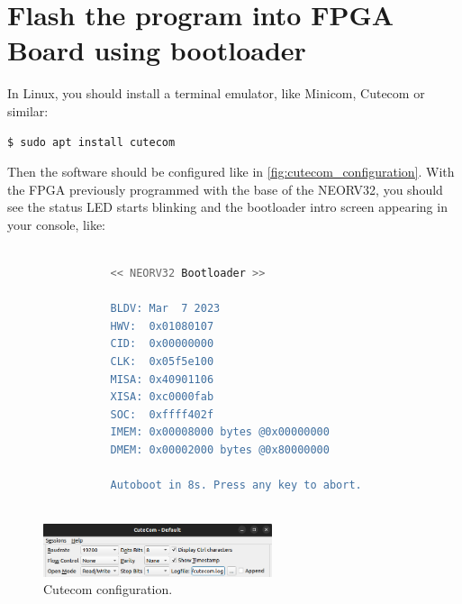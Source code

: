     \section{Flash the program into FPGA Board using bootloader}
    
        In Linux, you should install a terminal emulator, like Minicom, Cutecom or similar:
        
            \begin{lstlisting}[backgroundcolor = \color{lightgray}, language=bash]
                $ sudo apt install cutecom
            \end{lstlisting}
        
        Then the software should be configured like in \autoref{fig:cutecom_configuration}.  With the FPGA previously programmed with the base of the NEORV32, you should see the status LED starts blinking and the bootloader intro screen appearing in your console, like:
        
            \begin{lstlisting}[backgroundcolor = \color{lightgray}, language=bash]
            
                << NEORV32 Bootloader >>
            
                BLDV: Mar  7 2023
                HWV:  0x01080107
                CID:  0x00000000
                CLK:  0x05f5e100
                MISA: 0x40901106
                XISA: 0xc0000fab
                SOC:  0xffff402f
                IMEM: 0x00008000 bytes @0x00000000
                DMEM: 0x00002000 bytes @0x80000000
            
                Autoboot in 8s. Press any key to abort.
            
            \end{lstlisting}
            
            \begin{figure}[!ht]
                \begin{center}
                    \includegraphics[width= 0.6\textwidth]{figures/cutecom_configuration.png}
                    \caption{Cutecom configuration.}
                    \label{fig:cutecom_configuration}
                \end{center}
            \end{figure}
            
